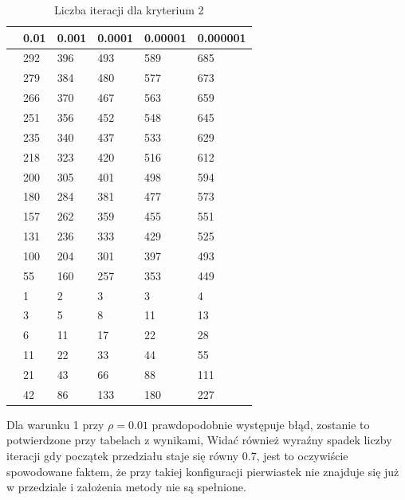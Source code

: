 \documentclass{article}
\begin{document}
\begin{table}[H]
\centering
\begin{tabular}{|l|l|l|l|l|l|}
\hline
& 0.01 & 0.001 & 0.0001 & 0.00001 & 0.000001 \\ \hline
[0.10, 1.90] & 292 & 396 & 493 & 589 & 685 \\ \hline
[0.10, 1.80] & 279 & 384 & 480 & 577 & 673 \\ \hline
[0.10, 1.70] & 266 & 370 & 467 & 563 & 659 \\ \hline
[0.10, 1.60] & 251 & 356 & 452 & 548 & 645 \\ \hline
[0.10, 1.50] & 235 & 340 & 437 & 533 & 629 \\ \hline
[0.10, 1.40] & 218 & 323 & 420 & 516 & 612 \\ \hline
[0.10, 1.30] & 200 & 305 & 401 & 498 & 594 \\ \hline
[0.10, 1.20] & 180 & 284 & 381 & 477 & 573 \\ \hline
[0.10, 1.10] & 157 & 262 & 359 & 455 & 551 \\ \hline
[0.10, 1.00] & 131 & 236 & 333 & 429 & 525 \\ \hline
[0.10, 0.90] & 100 & 204 & 301 & 397 & 493 \\ \hline
[0.10, 0.80] & 55 & 160 & 257 & 353 & 449 \\ \hline
[0.10, 0.70] & 1 & 2 & 3 & 3 & 4 \\ \hline
[0.10, 0.60] & 3 & 5 & 8 & 11 & 13 \\ \hline
[0.10, 0.50] & 6 & 11 & 17 & 22 & 28 \\ \hline
[0.10, 0.40] & 11 & 22 & 33 & 44 & 55 \\ \hline
[0.10, 0.30] & 21 & 43 & 66 & 88 & 111 \\ \hline
[0.10, 0.20] & 42 & 86 & 133 & 180 & 227 \\ \hline
\end{tabular}
\caption{Liczba iteracji dla kryterium 2}
\end{table}

Dla warunku 1 przy $\rho = 0.01$ prawdopodobnie występuje błąd, zostanie to potwierdzone przy tabelach z wynikami,
Widać również wyraźny spadek liczby iteracji gdy początek przedziału staje się równy 0.7, jest to oczywiście spowodowane faktem,
że przy takiej konfiguracji pierwiastek nie znajduje się już w przedziale i założenia metody nie są spełnione.
\end{document}
